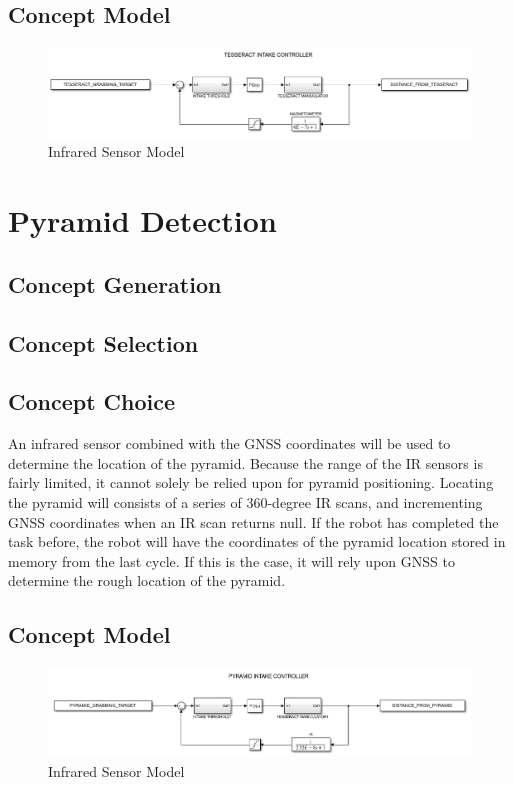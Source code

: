 \documentclass[12pt]{article}
\begin{document}
\subsection{Concept Model}\begin{figure}[htb!]
\begin{center}
\caption{Infrared Sensor Model}
\includegraphics[scale=0.75]{Figures/simulink_tesseract}
\end{center}
\end{figure}
\FloatBarrier

\section{Pyramid Detection}
\subsection{Concept Generation}
\subsection{Concept Selection}
\subsection{Concept Choice}
An infrared sensor combined with the GNSS coordinates will be used to determine the location of the pyramid. Because the range of the IR sensors is fairly limited, it cannot solely be relied upon for pyramid positioning. Locating the pyramid will consists of a series of 360-degree IR scans, and incrementing GNSS coordinates when an IR scan returns null. If the robot has completed the task before, the robot will have the coordinates of the pyramid location stored in memory from the last cycle. If this is the case, it will rely upon GNSS to determine the rough location of the pyramid. 
\subsection{Concept Model}
\begin{figure}[htb!]
\begin{center}
\caption{Infrared Sensor Model}
\includegraphics[scale=0.75]{Figures/simulink_pyramid}
\end{center}
\end{figure}
\FloatBarrier
\end{document}
